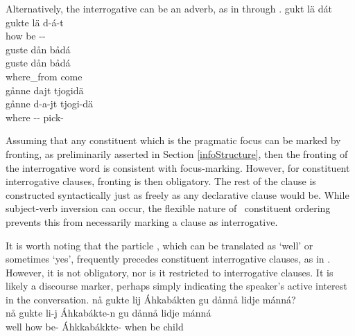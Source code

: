 Alternatively, the interrogative can be an adverb, as in  through . %
\ea\label{questionWordQ6}%
\glll	gukt lä dát\\
	gukte lä d-á-t\\
	how be\BS{} --\\\nopagebreak
{} 
\z
\ea\label{questionWordQ7}%
\glll	guste dån bådá\\
	guste dån bådá\\
	where\_from  come\BS{}\\\nopagebreak
{} 
\z
\ea\label{questionWordQ8}%
\glll	gånne dajt tjogidä\\
	gånne d-a-jt tjogi-dä\\
	where -- pick-\\\nopagebreak
{} 
\z

Assuming that any constituent which is the pragmatic focus can be marked by fronting, as preliminarily asserted in Section \ref{infoStructure}, then the fronting of the interrogative word is consistent with focus-marking. However, for constituent interrogative clauses, fronting is then obligatory. 
The rest of the clause is constructed syntactically just as freely as any declarative clause would be. While subject-verb inversion can occur, the flexible nature of \PS\ constituent ordering prevents this from necessarily marking a clause as interrogative. 

It is worth noting that the particle , which can be translated as ‘well’ or sometimes ‘yes’, frequently precedes constituent interrogative clauses, as in . However, it is not obligatory, nor is it restricted to interrogative clauses. It is likely a discourse marker, perhaps simply indicating the speaker’s active interest in the conversation.
\ea\label{nåQ1}%
\glll	nå gukte lij Áhkabákten gu dånnå lidje mánná?\\
	nå gukte li-j Áhkabákte-n gu dånnå lidje mánná\\
	well how be- Áhkkabákkte- when  be\BS{} child\BS{}\\\nopagebreak
{} 
\z


